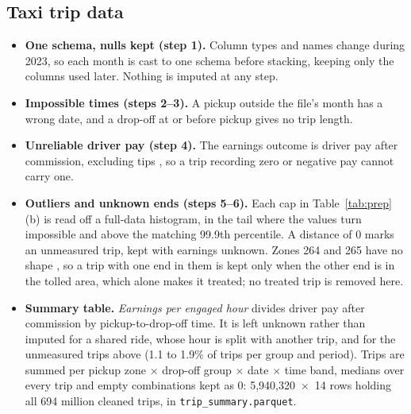 \documentclass[11pt]{article}
\begin{document}
\subsection{Taxi trip data}
\label{sec:taxidata}
\begin{itemize}[leftmargin=*, itemsep=1pt, topsep=2pt]
    \item \textbf{One schema, nulls kept (step 1).} Column types and names change during 2023, so each month is cast to one schema before stacking, keeping only the columns used later. Nothing is imputed at any step.
    \item \textbf{Impossible times (steps 2--3).} A pickup outside the file's month has a wrong date, and a drop-off at or before pickup gives no trip length.
    \item \textbf{Unreliable driver pay (step 4).} The earnings outcome is driver pay after commission, excluding tips \cite{tlchvfhvdict}, so a trip recording zero or negative pay cannot carry one.
    \item \textbf{Outliers and unknown ends (steps 5--6).} Each cap in Table~\ref{tab:prep}(b) is read off a full-data histogram, in the tail where the values turn impossible and above the matching 99.9th percentile. A distance of 0 marks an unmeasured trip, kept with earnings unknown. Zones 264 and 265 have no shape \cite{tlczones}, so a trip with one end in them is kept only when the other end is in the tolled area, which alone makes it treated; no treated trip is removed here.
    \item \textbf{Summary table.} \emph{Earnings per engaged hour} divides driver pay after commission by pickup-to-drop-off time. It is left unknown rather than imputed for a shared ride, whose hour is split with another trip, and for the unmeasured trips above (1.1 to 1.9\% of trips per group and period). Trips are summed per pickup zone $\times$ drop-off group $\times$ date $\times$ time band, medians over every trip and empty combinations kept as 0: 5,940,320~$\times$~14 rows holding all 694 million cleaned trips, in \texttt{trip\_summary.parquet}.
\end{itemize}
\end{document}
